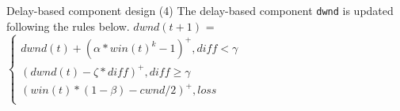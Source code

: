 \begin{frame}{Delay-based component design (4)}
  The delay-based component \texttt{dwnd} is updated following the
  rules below. \newline \newline $dwnd(t+1)$ =
  \center
  \begin{math}
  	\left\{
    	\begin{array}{l}
     		 dwnd (t) + (\alpha*win(t)^k - 1)^+, diff < \gamma\\
      		 (dwnd(t) - \zeta*diff)^+, diff \geq \gamma\\
      		 (win(t)*(1-\beta) - cwnd/2)^+, loss\\
    	\end{array}
  \right.
\end{math}

\end{frame}

